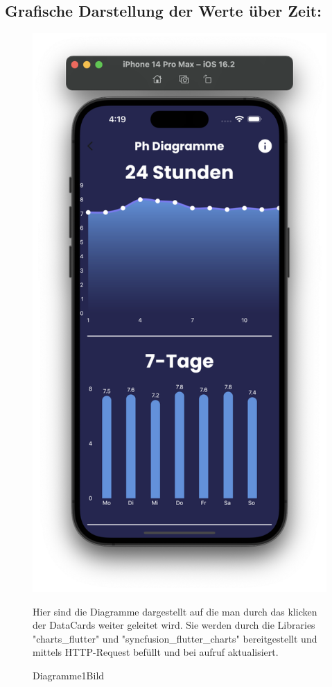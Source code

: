 \subsection*{Grafische Darstellung der Werte über Zeit:}

\begin{figure}[h!]
    \begin{minipage}[c]{0.4\textwidth}
      \includegraphics[width=\textwidth]{./pics/Diagramme1Bild.png}
      \caption{Diagramme1Bild}
    \end{minipage}
    \begin{minipage}[c]{0.5\textwidth}
      \label{fig:DigrammeApp1}
      Hier sind die Diagramme dargestellt auf die man durch das klicken der DataCards weiter geleitet wird. 
      Sie werden durch die Libraries "charts\_flutter" und "syncfusion\_flutter\_charts" bereitgestellt und mittels
      HTTP-Request befüllt und bei aufruf aktualisiert.

    \end{minipage}
\end{figure}
